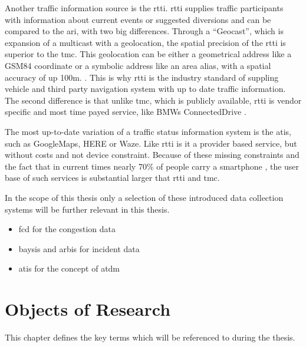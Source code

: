 \documentclass[a4paper,12pt]{report}
\begin{document}
Another traffic information source is the \acrfull{rtti}. \acrshort{rtti} supplies traffic participants with information about current events or suggested diversions and can be compared to the \acrfull{ari}, with two big differences. Through a “Geocast”, which is expansion of a multicast with a geolocation, the spatial precision of the \acrshort{rtti} is superior to the \acrshort{tmc}. This geolocation can be either a geometrical address like a GSM84 coordinate or a symbolic address like an area alias, with a spatial accuracy of up 100m.  \cite{LAPID2020,HindenDeering2006,ImielinskiNavas1996}. This is why \acrshort{rtti} is the industry standard of suppling vehicle and third party navigation system with up to date traffic information. The second difference is that unlike \acrshort{tmc}, which is publicly available, \acrshort{rtti} is vendor specific and most time payed service, like BMWs ConnectedDrive \cite{BMW2020}. 


The most up-to-date variation of a traffic status information system is the \acrfull{atis}, such as GoogleMaps, HERE or Waze. Like \acrshort{rtti} is it a provider based service, but without costs and not device constraint. Because of these missing constraints and the fact that in current times nearly 70\% of people carry a smartphone \cite{IZM2020}, the user base of such services is substantial larger that \acrshort{rtti} and \acrshort{tmc}.

\bigskip

In the scope of this thesis only a selection of these introduced data collection systems will be further relevant in this thesis. 
\begin{itemize}
  \item \acrshort{fcd} for the congestion data
  \item \acrshort{baysis} and \acrshort{arbis} for incident data
  \item \acrshort{atis} for the concept of \acrshort{atdm}
\end{itemize}

\chapter{Objects of Research}
	This chapter defines the key terms which will be referenced to during the thesis.
\end{document}
